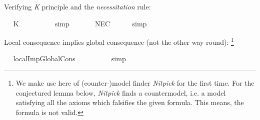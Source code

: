 \begin{isabellebody}
%
\begin{isamarkuptext}%
Verifying \emph{K} principle and the \emph{necessitation} rule:%
\end{isamarkuptext}\isamarkuptrue%
\ \isamarkupfalse%
\ K{\isacharcolon}\ {\isachardoublequoteopen}{\isasymlfloor}{\isacharparenleft}\isactrlbold {\isasymbox}{\isacharparenleft}{\isasymphi}\ \isactrlbold {\isasymrightarrow}\ {\isasympsi}{\isacharparenright}{\isacharparenright}\ \isactrlbold {\isasymrightarrow}\ {\isacharparenleft}\isactrlbold {\isasymbox}{\isasymphi}\ \isactrlbold {\isasymrightarrow}\ \isactrlbold {\isasymbox}{\isasympsi}{\isacharparenright}{\isasymrfloor}{\isachardoublequoteclose}%
\ %
%
\isamarkupfalse%
\ simp\ \ \ \ %
%
%
%
\isanewline
\ \isamarkupfalse%
\ NEC{\isacharcolon}\ {\isachardoublequoteopen}{\isasymlfloor}{\isasymphi}{\isasymrfloor}\ {\isasymLongrightarrow}\ {\isasymlfloor}\isactrlbold {\isasymbox}{\isasymphi}{\isasymrfloor}{\isachardoublequoteclose}%
\ %
%
\isamarkupfalse%
\ simp\ \ \ \ %
%
%
%
%
\begin{isamarkuptext}%
Local consequence implies global consequence (not the other way round):
  \footnote{We make use here of (counter-)model finder \emph{Nitpick} \cite{Nitpick} for the first time.  
  For the conjectured lemma below, \emph{Nitpick} finds a countermodel, i.e. a model satisfying all 
  the axioms which falsifies the given formula. This means, the formula is not valid.}%
\end{isamarkuptext}\isamarkuptrue%
\ \isamarkupfalse%
\ localImpGlobalCons{\isacharcolon}\ {\isachardoublequoteopen}{\isasymlfloor}{\isasymphi}\ \isactrlbold {\isasymrightarrow}\ {\isasymxi}{\isasymrfloor}\ {\isasymLongrightarrow}\ {\isasymlfloor}{\isasymphi}{\isasymrfloor}\ {\isasymlongrightarrow}\ {\isasymlfloor}{\isasymxi}{\isasymrfloor}{\isachardoublequoteclose}%
\ %
%
\isamarkupfalse%
\ simp%
%
%
\isanewline
\ \isamarkupfalse%
\ {\isachardoublequoteopen}{\isasymlfloor}{\isasymphi}{\isasymrfloor}\ {\isasymlongrightarrow}\ {\isasymlfloor}{\isasymxi}{\isasymrfloor}\ {\isasymLongrightarrow}\ {\isasymlfloor}{\isasymphi}\ \isactrlbold {\isasymrightarrow}\ {\isasymxi}{\isasymrfloor}{\isachardoublequoteclose}\ \isamarkupfalse%
%
\ %
%
\isamarkupfalse%
\ %
%
%
%
%
\begin{isamarkuptext}%

\end{isamarkuptext}
\end{isabellebody}
